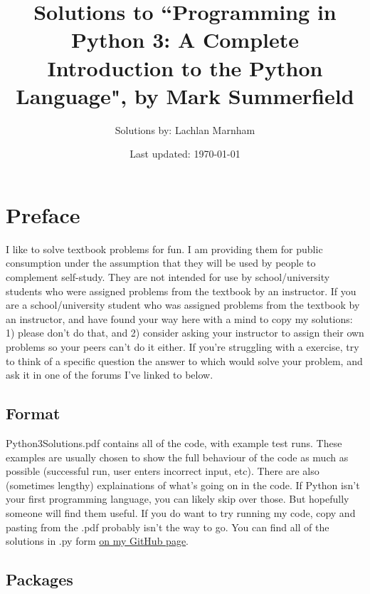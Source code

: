 \documentclass{report}
\begin{document}
\makeatletter
\lst@CCPutMacro
    \@empty\z@\@empty
\makeatother
\title{Solutions to ``Programming in Python 3: A Complete Introduction to the Python Language", by Mark Summerfield}
\author{Solutions by: Lachlan Marnham}
\date{Last updated: \today}
\maketitle

\chapter*{Preface}
I like to solve textbook problems for fun. I am providing them for public consumption under the assumption that they will be 
used by people to complement self-study. They are not intended for use by school/university students who were assigned 
problems from the textbook by an instructor. If you are a school/university student who was assigned problems from the 
textbook by an instructor, and have found your way here with a mind to copy my solutions: 1) please don't do that, and 
2) consider asking your instructor to assign their own problems so your peers can't do it either. If you're struggling with a 
exercise, try to think of a specific question the answer to which would solve your problem, and ask it in one of the forums 
I've linked to below.

\section*{Format}

Python3Solutions.pdf contains all of the code, with example test runs. These examples are usually chosen to show the full 
behaviour of the code as much as possible (successful run, user enters incorrect input, etc). There are also (sometimes 
lengthy) explainations of what's going on in the code. If Python isn't your first programming language, you can likely skip 
over those. But hopefully someone will find them useful. If you do want to try running my code, copy and pasting from the 
.pdf probably isn't the way to go. You can find all of the solutions in .py form 
\href{https://github.com/LachlanMarnham/SolutionsToProgrammingInPython3}{on my GitHub page}.

\section*{Packages}
\end{document}
